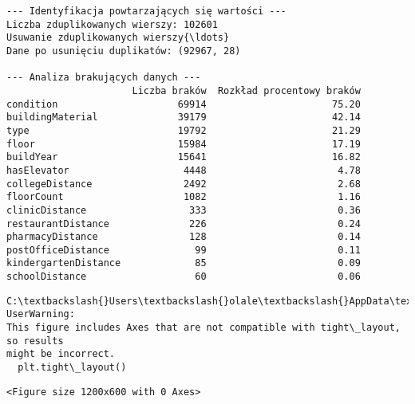\documentclass[11pt]{article}
\begin{document}
\begin{Verbatim}[commandchars=\\\{\}]
--- Identyfikacja powtarzających się wartości ---
Liczba zduplikowanych wierszy: 102601
Usuwanie zduplikowanych wierszy{\ldots}
Dane po usunięciu duplikatów: (92967, 28)

--- Analiza brakujących danych ---
                      Liczba braków  Rozkład procentowy braków
condition                     69914                      75.20
buildingMaterial              39179                      42.14
type                          19792                      21.29
floor                         15984                      17.19
buildYear                     15641                      16.82
hasElevator                    4448                       4.78
collegeDistance                2492                       2.68
floorCount                     1082                       1.16
clinicDistance                  333                       0.36
restaurantDistance              226                       0.24
pharmacyDistance                128                       0.14
postOfficeDistance               99                       0.11
kindergartenDistance             85                       0.09
schoolDistance                   60                       0.06
    \end{Verbatim}

    \begin{Verbatim}[commandchars=\\\{\}]
C:\textbackslash{}Users\textbackslash{}olale\textbackslash{}AppData\textbackslash{}Local\textbackslash{}Temp\textbackslash{}ipykernel\_12048\textbackslash{}731635470.py:36: UserWarning:
This figure includes Axes that are not compatible with tight\_layout, so results
might be incorrect.
  plt.tight\_layout()
    \end{Verbatim}

    
    \begin{Verbatim}[commandchars=\\\{\}]
<Figure size 1200x600 with 0 Axes>
    \end{Verbatim}

    
    \begin{center}
    \end{center}
    { \hspace*{\fill} \\}
    
    \begin{center}
    \end{center}
    { \hspace*{\fill} \\}
    
\end{document}
